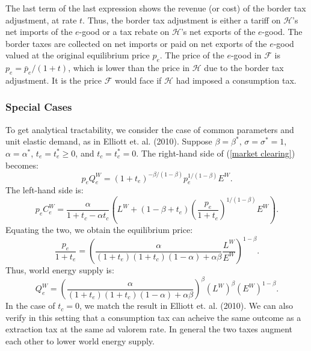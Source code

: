 \documentclass[notitlepage,12pt]{article}
\begin{document}
The last term of the last expression shows the revenue (or cost) of the
border tax adjustment, at rate $t$. Thus, the border tax adjustment is
either a tariff on $\mathcal{H}$'s net imports of the $e$-good or a tax
rebate on $\mathcal{H}$'s net exports of the $e$-good. The border taxes are
collected on net imports or paid on net exports of the $e$-good valued at
the original equilibrium price $p_{e}$. The price of the $e$-good in $%
\mathcal{F}$ is $p_{e}=\bar{p}_{e}/(1+t)$, which is lower than the price in $%
\mathcal{H}$ due to the border tax adjustment. It is the price $\mathcal{F}$
would face if $\mathcal{H}$ had imposed a consumption tax.

\subsubsection{Special Cases}

To get analytical tractability, we consider the case of common parameters
and unit elastic demand, as in Elliott et. al. (2010). Suppose $\beta =\beta
^{\ast }$, $\sigma =\sigma ^{\ast }=1$, $\alpha =\alpha ^{\ast }$, $%
t_{e}=t_{e}^{\ast }\geq 0$, and $t_{c}=t_{c}^{\ast }=0$. The right-hand side
of (\ref{market clearing}) becomes:%
\begin{equation*}
p_{e}Q_{e}^{W}=\left( 1+t_{e}\right) ^{-\beta /(1-\beta )}p_{e}^{1/(1-\beta
)}E^{W}.
\end{equation*}%
The left-hand side is:%
\begin{equation*}
p_{e}C_{e}^{W}=\frac{\alpha }{1+t_{c}-\alpha t_{c}}\left( L^{W}+\left(
1-\beta +t_{e}\right) \left( \frac{p_{e}}{1+t_{e}}\right) ^{1/(1-\beta
)}E^{W}\right) .
\end{equation*}%
Equating the two, we obtain the equilibrium price:%
\begin{equation*}
\frac{p_{e}}{1+t_{e}}=\left( \frac{\alpha }{\left( 1+t_{e}\right) \left(
1+t_{c}\right) \left( 1-\alpha \right) +\alpha \beta }\frac{L^{W}}{E^{W}}%
\right) ^{1-\beta }.
\end{equation*}%
Thus, world energy supply is:%
\begin{equation*}
Q_{e}^{W}=\left( \frac{\alpha }{\left( 1+t_{e}\right) \left( 1+t_{c}\right)
\left( 1-\alpha \right) +\alpha \beta }\right) ^{\beta }\left( L^{W}\right)
^{\beta }\left( E^{W}\right) ^{1-\beta }.
\end{equation*}%
In the case of $t_{c}=0$, we match the result in Elliott et. al. (2010). We
can also verify in this setting that a consumption tax can acheive the same
outcome as a extraction tax at the same ad valorem rate. In general the two
taxes augment each other to lower world energy supply.
\end{document}
